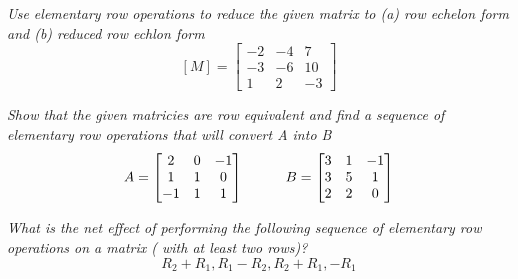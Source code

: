 \documentclass[12pt,letterpaper]{hmcpset}
\begin{document}
\section*{}

\begin{problem}[2.2.14]
\textit{Use elementary row operations to reduce the given matrix to (a) row echelon form and (b) reduced row echlon form}
$$[M]=\begin{bmatrix}
-2 & -4 & 7 \\ -3 & -6 & 10 \\ 1 & 2 & -3
\end{bmatrix} 
$$
\end{problem}

\begin{solution}

\end{solution}

\newpage

\begin{problem}[2.2.18]
\textit{Show that the given matricies are row equivalent and find a sequence of elementary row operations that will convert A into B }
$$ 
A = \begin{bmatrix}
	2&0&-1\\
	1&1&0\\
	-1&1&1
\end{bmatrix}
\indent \indent  
B=\begin{bmatrix}
	3&1&-1\\
	3&5&1\\
	2&2&0
\end{bmatrix}
$$
\end{problem}

\begin{solution}

\end{solution}

\newpage

\begin{problem}[2.2.20]
\textit{What is the net effect of performing the following sequence of elementary row operations on a matrix ( with at least two rows)? }
$$ R_2+ R_1, R_1-R_2, R_2+R_1, -R_1 $$
\end{problem}
\end{document}
